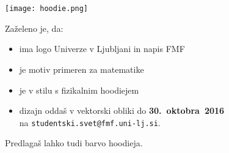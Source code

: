 \documentclass[a4paper,oneside,12pt]{article}
\title{\Title}
\author{\Author}
\date{\today}
\theoremstyle{definition}
\newcommand{\veliko}[1]{\scalebox{4}{#1}}
\newcommand{\srednje}[1]{\scalebox{2.5}{#1}}
\begin{document}
\srednje{ŠS FMF razpisuje natečaj za}

\setlength{\baselineskip}{40pt}
\vspace{-25pt}

\begin{center}
  \veliko{\bf dizajn} \\
  \veliko{\bf matematičnega} \\
  \veliko{\bf hoodiea}

  \texttt{[image: hoodie.png]}
\end{center}

\fontsize{24}{26}\selectfont

\vspace{-25pt}
Zaželeno je, da:
\vspace{-35pt}
\begin{itemize}
  \item ima logo Univerze v Ljubljani in napis FMF
  \item je motiv primeren za matematike
  \item je v stilu s fizikalnim hoodiejem
  \item dizajn oddaš v vektorski obliki do \textbf{30.~oktobra~2016} \\[5pt]
        na \texttt{studentski.svet@fmf.uni-lj.si}.
\end{itemize}
\vspace{-25pt}
Predlagaš lahko tudi barvo hoodieja.
\end{document}
